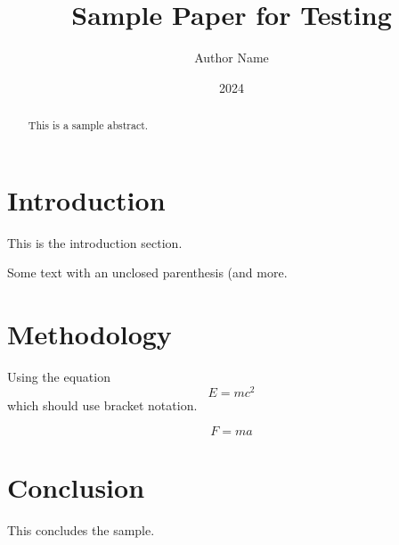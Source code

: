 \documentclass[12pt]{article}
\title{Sample Paper for Testing}
\author{Author Name}
\date{2024}
\begin{document}
\maketitle

\begin{abstract}
This is a sample abstract.
\end{abstract}

\section{Introduction}
This is the introduction section.

Some text with an unclosed parenthesis (and more.

\section{Methodology}

Using the equation $$ E = mc^2 $$ which should use bracket notation.

\begin{equation}
F = ma
\end{equation}

\section{Conclusion}
This concludes the sample.
\end{document}
